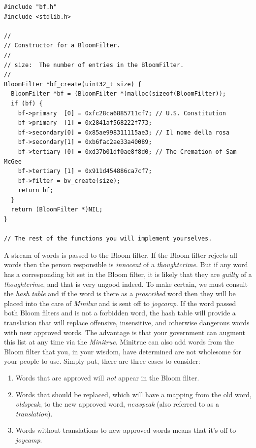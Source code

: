 \documentclass{article}
\begin{document}
\begin{lstlisting}[title=bf.c]
#include "bf.h"
#include <stdlib.h>

//
// Constructor for a BloomFilter.
//
// size:  The number of entries in the BloomFilter.
//
BloomFilter *bf_create(uint32_t size) {
  BloomFilter *bf = (BloomFilter *)malloc(sizeof(BloomFilter));
  if (bf) {
    bf->primary  [0] = 0xfc28ca6885711cf7; // U.S. Constitution
    bf->primary  [1] = 0x2841af568222f773;
    bf->secondary[0] = 0x85ae998311115ae3; // Il nome della rosa
    bf->secondary[1] = 0xb6fac2ae33a40089;
    bf->tertiary [0] = 0xd37b01df0ae8f8d0; // The Cremation of Sam McGee
    bf->tertiary [1] = 0x911d454886ca7cf7;
    bf->filter = bv_create(size);
    return bf;
  }
  return (BloomFilter *)NIL;
}

// The rest of the functions you will implement yourselves.
\end{lstlisting}

A stream of words is passed to the Bloom filter. If the Bloom filter rejects all
words then the person responsible is \emph{innocent} of a \emph{thoughtcrime}.
But if any word has a corresponding bit set in the Bloom filter, it is likely
that they are \emph{guilty} of a \emph{thoughtcrime}, and that is very ungood
indeed. To make certain, we must consult the \emph{hash table} and if the word
is there as a \emph{proscribed} word then they will be placed into the care of
\emph{Miniluv} and is sent off to \emph{joycamp}.  If the word passed both Bloom
filters and is not a forbidden word, the hash table will provide a translation
that will replace offensive, insensitive, and otherwise dangerous words with new
approved words. The advantage is that your government can augment this list at
any time via the \emph{Minitrue}. Minitrue can also add words from the Bloom
filter that you, in your wisdom, have determined are not wholesome for your
people to use. Simply put, there are three cases to consider:

\begin{enumerate}
\item Words that are approved will \emph{not} appear in the Bloom filter.
\item Words that should be replaced, which will have a mapping from the old
    word, \emph{oldspeak}, to the new approved word, \emph{newspeak} (also
    referred to as a \emph{translation}).
\item Words without translations to new approved words means that it's
    off to \emph{joycamp}.
\end{enumerate}
\end{document}
